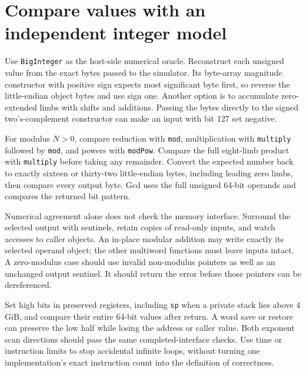 \section{Compare values with an independent integer model}
Use \texttt{BigInteger} as the host-side numerical oracle. Reconstruct each unsigned
value from the exact bytes passed to the simulator. Its byte-array magnitude constructor
with positive sign expects most significant byte first, so reverse the little-endian
object bytes and use sign one. Another option is to accumulate zero-extended limbs
with shifts and additions. Passing the bytes directly to the signed two's-complement
constructor can make an input with bit 127 set negative.

For modulus \(N>0\), compare reduction with \texttt{mod}, multiplication with
\texttt{multiply} followed by \texttt{mod}, and powers with \texttt{modPow}. Compare
the full eight-limb product with \texttt{multiply} before taking any remainder.
Convert the expected number back to exactly sixteen or thirty-two little-endian bytes,
including leading zero limbs, then compare every output byte. Gcd uses the full
unsigned 64-bit operands and compares the returned bit pattern.

Numerical agreement alone does not check the memory interface. Surround the selected
output with sentinels, retain copies of read-only inputs, and watch accesses to caller
objects. An in-place modular addition may write exactly its selected operand object;
the other multiword functions must leave inputs intact. A zero-modulus case should use
invalid non-modulus pointers as well as an unchanged output sentinel. It should return
the error before those pointers can be dereferenced.

Set high bits in preserved registers, including \texttt{sp} when a private stack lies
above 4 GiB, and compare their entire 64-bit values after return. A word save or restore
can preserve the low half while losing the address or caller value. Both exponent scan
directions should pass the same completed-interface checks. Use time or instruction
limits to stop accidental infinite loops, without turning one implementation's exact
instruction count into the definition of correctness.
